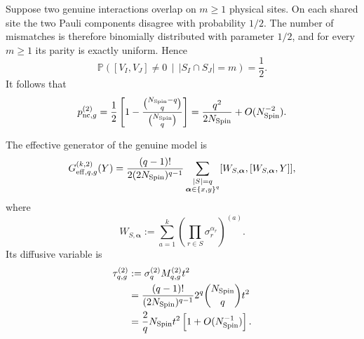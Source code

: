\documentclass{article}
\theoremstyle{definition}
\begin{document}
Suppose two genuine interactions overlap on $m\geq1$ physical sites.
On each shared site the two Pauli components disagree with probability
$1/2$.  The number of mismatches is therefore binomially distributed
with parameter $1/2$, and for every $m\geq1$ its parity is exactly
uniform.  Hence
\begin{equation}
    {\mathbb P}
    \left(
       [V_I,V_J]\neq0
       \,\middle|\,
       |S_I\cap S_J|=m
    \right)
    =
    \frac12.
    \label{eq:BDN_conditional_pnc}
\end{equation}
It follows that
\begin{equation}
    p_{{\rm nc},g}^{(2)}
    =
    \frac12
    \left[
       1-
       \frac{
          \binom{N_{\rm Spin}-q}{q}
       }{
          \binom{N_{\rm Spin}}q
       }
    \right]
    =
    \frac{q^2}{2N_{\rm Spin}}
    +
    O(N_{\rm Spin}^{-2}).
    \label{eq:BDN_pnc}
\end{equation}

The effective generator of the genuine model is
\begin{equation}
    G_{{\rm eff},q,g}^{(k,2)}(Y)
    =
    \frac{(q-1)!}
         {2(2N_{\rm Spin})^{q-1}}
    \sum_{\substack{|S|=q\\
                    \boldsymbol\alpha\in\{x,y\}^q}}
    [W_{S,\boldsymbol\alpha},
     [W_{S,\boldsymbol\alpha},Y]],
    \label{eq:BDN_genuine_Geff}
\end{equation}
where
\begin{equation}
    W_{S,\boldsymbol\alpha}
    :=
    \sum_{a=1}^k
    \left(
       \prod_{r\in S}\sigma_r^{\alpha_r}
    \right)^{(a)}.
    \label{eq:BDN_genuine_W}
\end{equation}
Its diffusive variable is
\begin{align}
    \tau_{q,g}^{(2)}
    &:=
    \sigma_q^{(2)}M_{q,g}^{(2)}t^2
    \nonumber\\
    &=
    \frac{(q-1)!}
         {(2N_{\rm Spin})^{q-1}}
    2^q
    \binom{N_{\rm Spin}}q
    t^2
    \nonumber\\
    &=
    \frac{2}{q}
    N_{\rm Spin}t^2
    \left[
       1+O(N_{\rm Spin}^{-1})
    \right].
    \label{eq:BDN_tau_general}
\end{align}
\end{document}
